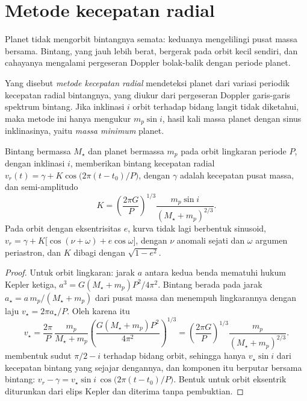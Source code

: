 \section{Metode kecepatan radial}\label{sec:b3:exoplanets:rv}

Planet tidak mengorbit bintangnya semata: keduanya mengelilingi pusat massa bersama.
Bintang, yang jauh lebih berat, bergerak pada orbit kecil sendiri, dan cahayanya
mengalami pergeseran Doppler bolak-balik dengan periode planet.

\begin{definition}\label{def:b3:exoplanets:rv}
Yang disebut \emph{metode kecepatan radial} mendeteksi
planet dari variasi periodik kecepatan radial bintangnya,
yang diukur dari pergeseran Doppler garis-garis spektrum bintang. Jika
inklinasi $i$ orbit terhadap bidang langit tidak diketahui, maka
metode ini hanya mengukur $m_p\sin i$, hasil kali massa planet dengan sinus
inklinasinya, yaitu \emph{massa minimum}
planet.
\end{definition}

\begin{theorem}\label{thm:b3:exoplanets:semi-amplitude}
Bintang bermassa $M_\star$ dan planet bermassa $m_p$ pada orbit lingkaran
periode $P$, dengan inklinasi $i$, memberikan bintang kecepatan radial
$v_r(t) = \gamma + K\cos\bigl(2\pi(t - t_0)/P\bigr)$, dengan $\gamma$ adalah
kecepatan pusat massa, dan semi-amplitudo
\[
K = \left(\frac{2\pi G}{P}\right)^{1/3}
    \frac{m_p\sin i}{(M_\star + m_p)^{2/3}} .
\]
Pada orbit dengan eksentrisitas $e$, kurva tidak lagi berbentuk sinusoid,
$v_r = \gamma + K\bigl[\cos(\nu + \omega) + e\cos\omega\bigr]$, dengan $\nu$
anomali sejati dan $\omega$ argumen periastron, dan $K$
dibagi dengan $\sqrt{1 - e^2}$.
\end{theorem}

\begin{proof}
Untuk orbit lingkaran: jarak $a$ antara kedua benda mematuhi
hukum Kepler ketiga, $a^3 = G(M_\star + m_p)P^2/4\pi^2$. Bintang berada
pada jarak $a_\star = a\,m_p/(M_\star + m_p)$ dari pusat massa
dan menempuh lingkarannya dengan laju $v_\star = 2\pi a_\star/P$. Oleh karena itu
\[
v_\star = \frac{2\pi}{P}\,\frac{m_p}{M_\star + m_p}
          \left(\frac{G(M_\star + m_p)P^2}{4\pi^2}\right)^{1/3}
        = \left(\frac{2\pi G}{P}\right)^{1/3}\frac{m_p}{(M_\star + m_p)^{2/3}} .
\]
 membentuk sudut $\pi/2 - i$ terhadap bidang
orbit, sehingga hanya $v_\star\sin i$ dari kecepatan bintang yang sejajar dengannya, dan
komponen itu berputar bersama bintang: $v_r - \gamma = v_\star\sin i\,
\cos\bigl(2\pi(t - t_0)/P\bigr)$. Bentuk untuk orbit eksentrik diturunkan dari
elips Kepler dan diterima tanpa pembuktian.
\end{proof}

